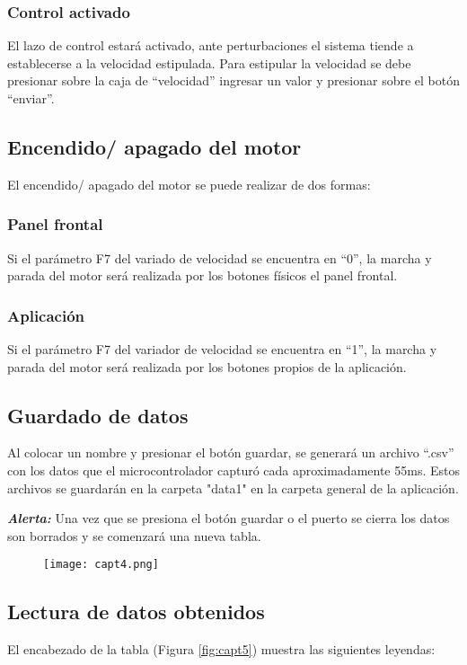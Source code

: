 \subsubsection{Control activado}
El lazo de control estará activado, ante perturbaciones el sistema tiende a establecerse a la velocidad estipulada. Para estipular la velocidad se debe presionar sobre la caja de “velocidad” ingresar un valor y presionar sobre el botón “enviar”.

\subsection{Encendido/ apagado del motor}
El encendido/ apagado del motor se puede realizar de dos formas:
\subsubsection{Panel frontal}
Si el parámetro F7 del variado de velocidad se encuentra en “0”, la marcha y parada del motor será realizada por los botones físicos el panel frontal.
\subsubsection{Aplicación}
Si el parámetro F7 del variador de velocidad se encuentra en “1”, la marcha y parada del motor será realizada por los botones propios de la aplicación.


\subsection{Guardado de datos}
Al colocar un nombre y presionar el botón guardar, se generará un archivo “.csv” con los datos que el microcontrolador capturó cada aproximadamente 55ms. Estos archivos se guardarán en la carpeta "data1" en la carpeta general de la aplicación. 

\textbf{\textit{Alerta:}} Una vez que se presiona el botón guardar o el puerto se cierra los datos son borrados y se comenzará una nueva tabla.

\begin{figure}[H]
	\centering
	\texttt{[image: capt4.png]}
	\label{fig:capt4}
\end{figure}


\subsection{Lectura de datos obtenidos}
El encabezado de la tabla (Figura \ref{fig:capt5}) muestra las siguientes leyendas:

